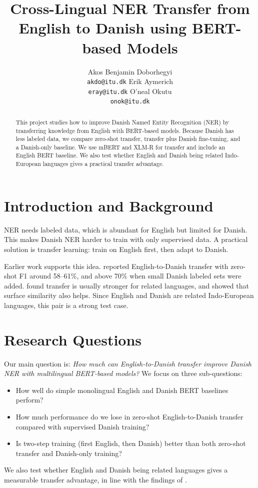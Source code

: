 \documentclass[11pt]{article}
\title{Cross-Lingual NER Transfer from English to Danish using BERT-based Models}
\author{Akos Benjamin Doborhegyi \\
  \texttt{akdo@itu.dk} \And
  Erik Aymerich \\
  \texttt{eray@itu.dk} \And
  O'neal Okutu \\
  \texttt{onok@itu.dk}}
\begin{document}
\maketitle

\begin{abstract}
This project studies how to improve Danish Named Entity Recognition (NER) by transferring knowledge from English with BERT-based models. Because Danish has less labeled data, we compare zero-shot transfer, transfer plus Danish fine-tuning, and a Danish-only baseline. We use mBERT and XLM-R for transfer and include an English BERT baseline. We also test whether English and Danish being related Indo-European languages gives a practical transfer advantage.
\end{abstract}

\section{Introduction and Background}
NER needs labeled data, which is abundant for English but limited for Danish. This makes Danish NER harder to train with only supervised data. A practical solution is transfer learning: train on English first, then adapt to Danish.

Earlier work supports this idea. \citet{plank2020danish} reported English-to-Danish transfer with zero-shot F1 around 58--61\%, and above 70\% when small Danish labeled sets were added. \citet{fu2023heterogeneous} found transfer is usually stronger for related languages, and \citet{sohn2024zeroshot} showed that surface similarity also helps. Since English and Danish are related Indo-European languages, this pair is a strong test case.

\section{Research Questions}
Our main question is: \textit{How much can English-to-Danish transfer improve Danish NER with multilingual BERT-based models?} We focus on three sub-questions:
\begin{itemize}
  \item How well do simple monolingual English and Danish BERT baselines perform?
  \item How much performance do we lose in zero-shot English-to-Danish transfer compared with supervised Danish training?
  \item Is two-step training (first English, then Danish) better than both zero-shot transfer and Danish-only training?
\end{itemize}
We also test whether English and Danish being related languages gives a measurable transfer advantage, in line with the findings of \citet{fu2023heterogeneous}.
\end{document}
